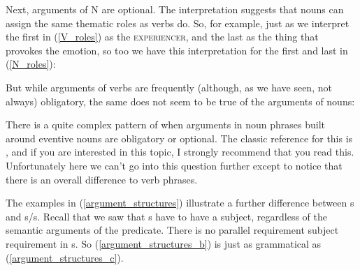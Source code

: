 \documentclass{article}
\begin{document}
Next, arguments of N are optional.
The interpretation suggests that nouns can assign the same thematic roles as verbs do.
So, for example, just as we interpret the first  in (\ref{V_roles}) as the \textsc{experiencer}, and the last  as the thing that provokes the emotion, so too we have this interpretation for the first and last  in (\ref{N_roles}):
\begin{exe}
\end{exe}
But while arguments of verbs are frequently (although, as we have seen, not always) obligatory, the same does not seem to be true of the arguments of nouns:
\begin{exe}
\begin{multicols}{2}
    \label{argument_structures}
    \end{multicols}
\end{exe}
There is a quite complex pattern of when arguments in noun phrases built around eventive nouns are obligatory or optional.
The classic reference for this is \citet{grimshaw_argument_1990}, and if you are interested in this topic, I strongly recommend that you read this.
Unfortunately here we can't go into this question further except to notice that there is an overall difference to verb phrases.

The examples in (\ref{argument_structures}) illustrate a further difference between s and s/s.
Recall that we saw that s have to have a subject, regardless of the semantic arguments of the predicate.
There is no parallel requirement subject requirement in s.
So (\ref{argument_structures_b}) is just as grammatical as (\ref{argument_structures_c}).  
\end{document}
